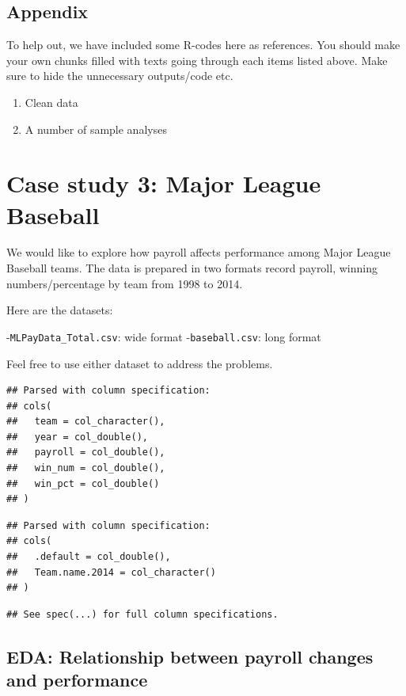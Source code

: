 \documentclass[
]{article}
\begin{document}
\hypertarget{appendix}{%
\subsection{Appendix}\label{appendix}}

To help out, we have included some R-codes here as references. You
should make your own chunks filled with texts going through each items
listed above. Make sure to hide the unnecessary outputs/code etc.

\begin{enumerate}
\def\labelenumi{\arabic{enumi}.}
\item
  Clean data
\item
  A number of sample analyses
\end{enumerate}

\hypertarget{case-study-3-major-league-baseball}{%
\section{Case study 3: Major League
Baseball}\label{case-study-3-major-league-baseball}}

We would like to explore how payroll affects performance among Major
League Baseball teams. The data is prepared in two formats record
payroll, winning numbers/percentage by team from 1998 to 2014.

Here are the datasets:

-\texttt{MLPayData\_Total.csv}: wide format -\texttt{baseball.csv}: long
format

Feel free to use either dataset to address the problems.

\begin{verbatim}
## Parsed with column specification:
## cols(
##   team = col_character(),
##   year = col_double(),
##   payroll = col_double(),
##   win_num = col_double(),
##   win_pct = col_double()
## )
\end{verbatim}

\begin{verbatim}
## Parsed with column specification:
## cols(
##   .default = col_double(),
##   Team.name.2014 = col_character()
## )
\end{verbatim}

\begin{verbatim}
## See spec(...) for full column specifications.
\end{verbatim}

\hypertarget{eda-relationship-between-payroll-changes-and-performance}{%
\subsection{EDA: Relationship between payroll changes and
performance}\label{eda-relationship-between-payroll-changes-and-performance}}
\end{document}
